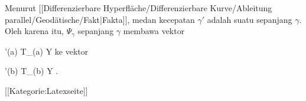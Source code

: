 Menurut
[[Differenzierbare Hyperfläche/Differenzierbare Kurve/Ableitung parallel/Geodätische/Fakt|Fakta]],
medan kecepatan $\gamma'$ adalah suatu
sepanjang $\gamma$. Oleh karena itu,
$\Psi_\gamma$ sepanjang $\gamma$ membawa vektor

\mavergleichskette
{\vergleichskette
{ \gamma'(a)
}
{ \in }{  T_{\gamma(a)} Y
}
{  }{
}
{    }{
}
{   }{
}
}
{}{}{}
ke vektor

\mavergleichskette
{\vergleichskette
{ \gamma'(b)
}
{ \in }{  T_{\gamma(b)} Y
}
{  }{
}
{    }{
}
{   }{
}
}
{}{}{.}

 [[Kategorie:Latexseite]]
